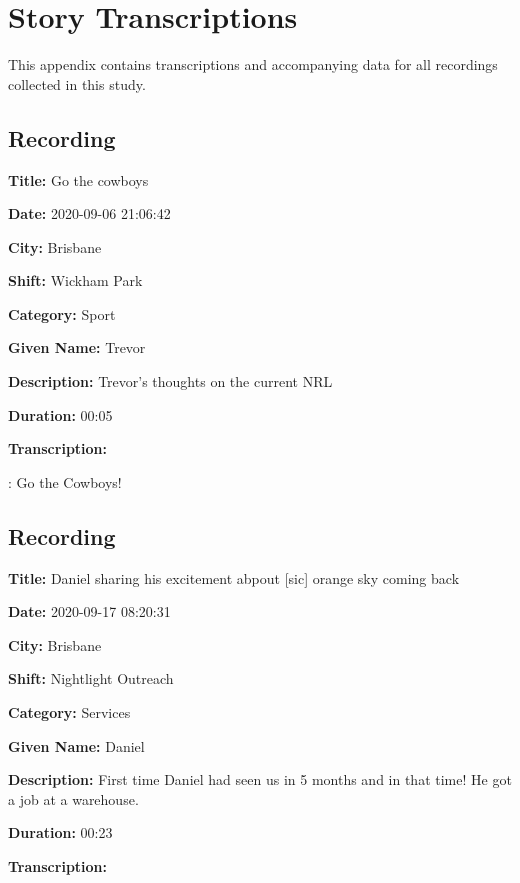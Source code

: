 {
\setlength{\parindent}{0em}

\chapter{Story Transcriptions}
\label{appendix:transcriptions}

This appendix contains transcriptions and accompanying data for all recordings collected in this study.

\tocless\section{Recording }

\textbf{Title:} Go the cowboys

\textbf{Date:} 2020-09-06 21:06:42

\textbf{City:} Brisbane

\textbf{Shift:} Wickham Park

\textbf{Category:} Sport

\textbf{Given Name:} Trevor

\textbf{Description:} Trevor's thoughts on the current NRL

\textbf{Duration:} 00:05

\textbf{Transcription:}

\begin{drama}

    \trevspeaks: Go the Cowboys!
\end{drama}

\tocless\section{Recording }

\textbf{Title:} Daniel sharing his excitement abpout [sic] orange sky coming back

\textbf{Date:} 2020-09-17 08:20:31

\textbf{City:} Brisbane

\textbf{Shift:} Nightlight Outreach

\textbf{Category:} Services

\textbf{Given Name:} Daniel

\textbf{Description:} First time Daniel had seen us in 5 months and in that time! He got a job at a warehouse.

\textbf{Duration:} 00:23

\textbf{Transcription:}

}
